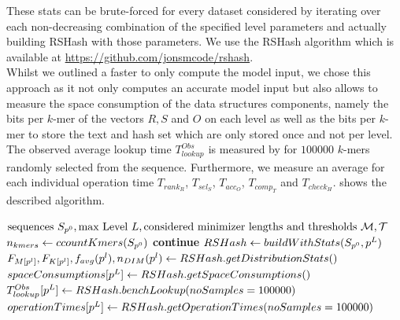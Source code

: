 \documentclass[a4paper,titlepage,onecolumn,oneside,12pt,nenglish,titlepage=firstiscover]{scrbook}
\theoremstyle{plain} %
\theoremstyle{definition} %
\theoremstyle{remark} %
\theoremstyle{plain}
\newcommand{\level}{l}
\newcommand{\access}{acc}
\newcommand{\contains}{rank}
\newcommand{\select}{sel}
\newcommand{\compare}{comp}
\newcommand{\timeForOperationOnStructure}[2]{T_{#1_{#2}}} %
\newcommand{\averageFrequency}{f_{avg}}
\newcommand{\possibleMinimizerLengths}{\mathcal{M}}
\newcommand{\possibleThresholds}{\mathcal{T}}
\begin{document}
\newcommand{\observed}[1]{#1^{Obs}}
These stats can be brute-forced for every dataset considered by iterating over each non-decreasing combination of the specified level parameters and actually building RSHash with those parameters. We use the RSHash algorithm which is available at \url{https://github.com/jonsmcode/rshash}.\\ Whilst we outlined a faster  to only compute the model input, we chose this approach as it not only computes an accurate model input but also allows to measure the space consumption of the data structures components, namely the bits per $k$-mer of the vectors $R, S$ and $O$ on each level as well as the bits per $k$-mer to store the text and hash set which are only stored once and not per level.\\
The observed average lookup time $\observed{\timeForOperationOnStructure{lookup}{}}$ is measured by for $100000$ $k$-mers randomly selected from the sequence. Furthermore, we measure an average for each individual operation time $\timeForOperationOnStructure{\contains}{R}$,
$\timeForOperationOnStructure{\select}{S}$,
$\timeForOperationOnStructure{\access}{O}$,
$\timeForOperationOnStructure{\compare}{T}$ and
$\timeForOperationOnStructure{check}{H}$.  shows the described algorithm.
\begin{algorithm}[h]
	\caption{Brute-force Computation of Model Input and Measurements Needed for Evaluation.} \label{algo:computeMinDistr}
	\begin{algorithmic} 
		\Input $
		\text{sequences } \sequences{0},
		\text{max Level } \numberOfLevels,
		\text{considered minimizer lengths and thresholds } \possibleMinimizerLengths, \possibleThresholds
		$
		\Function{statsComputation}{$\sequences{0}, \numberOfLevels, \possibleMinimizerLengths, \possibleThresholds$}
		\State $n_{kmers} \gets ccountKmers(S_{p^{0}})$
		\For{$\levelParameters{L} \in \possibleMinimizerLengths^L \times \possibleThresholds^L$}
		 \State \textbf{continue} \EndIf
		\State $RSHash \gets buildWithStats(S_{p^{0}}, p^{L})$
		\State $\CDF{\compactZV{M}{\levelParameters{\level}}},
		\CDF{\compactZV{K}{\levelParameters{\level}}},
		\averageFrequency(\levelParameters{\level}), \numberOfDistinctMinimizers{\levelParameters{\level}} \gets RSHash.getDistributionStats()$
		\State $spaceConsumptions [p^{L}] \gets RSHash.getSpaceConsumptions()$
		\State $\observed{\timeForOperationOnStructure{lookup}{}} [\levelParameters{L}] \gets RSHash.benchLookup(noSamples=100000)$
		\State $operationTimes [p^{L}] \gets RSHash.getOperationTimes(noSamples=100000)$
		\EndFor
		\EndFunction
	\end{algorithmic}
\end{algorithm}
\end{document}
